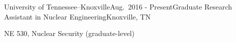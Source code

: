 \begin{rSubsection}{University of Tennessee--Knoxville}{Aug.\ 2016 - Present}{Graduate Research Assistant in Nuclear Engineering}{Knoxville, TN}
\item NE 530, Nuclear Security (graduate-level)
\end{rSubsection}








